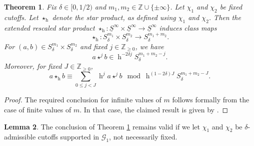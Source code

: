 \documentclass[reqno]{amsart}
\DeclareMathOperator{\h}{h}
\theoremstyle{plain} \newtheorem{theorem} {Theorem}
\theoremstyle{definition} \newtheorem{definition} [theorem] {Definition}
\theoremstyle{itplain} %
\newtheorem{lemma}[theorem]{Lemma}
\numberwithin{equation}{section}
\numberwithin{theorem}{section}
\renewcommand{\geq}{\geqslant}
\renewcommand{\leq}{\leqslant}
\begin{document}
\begin{theorem}\label{thm:basic-star-prod}
Fix $\delta \in [0,1/2)$ and $m_1, m_2 \in \mathbb{Z} \cup \{\pm \infty \}$.  Let $\chi_{1}$ and $\chi_2$ be fixed cutoffs.  Let $\star_{\h}$ denote the star product, as defined using $\chi_1$ and $\chi_2$.  Then the extended rescaled star product $\star_{\h} : \underline{S}^\infty \times \underline{S}^\infty \rightarrow \underline{S}^\infty$ induces class maps
\begin{equation*}
  \star_{\h} : S_{\delta}^{m_1} \times S_{\delta}^{m_2} \rightarrow S_{\delta}^{m_1 + m_2}.
\end{equation*}
For $(a,b) \in S_{\delta}^{m_1} \times S_{\delta}^{m_2}$ and fixed $j \in \mathbb{Z}_{\geq 0}$, we have
\begin{equation*}
  a \star^j b \in \h^{-2 \delta j} S_\delta^{m_1 + m_2 - j}.
\end{equation*}
Moreover, for fixed $J \in \mathbb{Z}_{\geq 0}$,
\begin{equation*}
  a \star_{\h} b \equiv \sum _{0 \leq j < J} \h^j a \star^j b \mod{
    \h^{(1 - 2 \delta) J} S_\delta  ^{m _1 + m _2 - J}.
  }
\end{equation*}
\end{theorem}
\begin{proof}
  The required conclusion for infinite values of $m$ follows formally from the case of finite values of $m$.  In that case, the claimed result is given by \cite[Thm 9.5]{2020arXiv201202187N}.
\end{proof}
\begin{lemma}\label{lem:concl-theor-refthm:b}
  The conclusion of Theorem \ref{thm:basic-star-prod} remains valid if we let $\chi_1$ and $\chi_2$ be $\delta$-admissible cutoffs supported in $\mathcal{G}_1$, not necessarily fixed.
\end{lemma}
\end{document}
